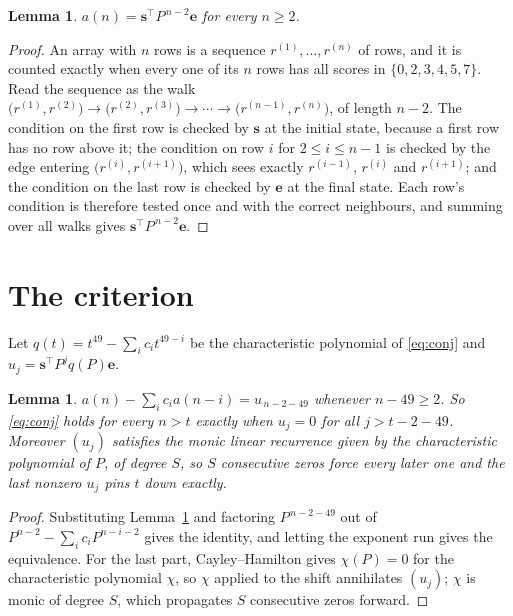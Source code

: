 \documentclass[11pt,a4paper]{article}
\theoremstyle{plain}
\newtheorem{lemma}[theorem]{Lemma}
\theoremstyle{definition}
\begin{document}
\begin{lemma}\label{lem:walk}
$a(n)=\mathbf{s}^{\!\top}P^{\,n-2}\mathbf{e}$ for every $n\ge2$.
\end{lemma}

\begin{proof}
An array with $n$ rows is a sequence $r^{(1)},\dots,r^{(n)}$ of rows, and it is counted
exactly when every one of its $n$ rows has all scores in $\{0,2,3,4,5,7\}$. Read the sequence as the
walk $\bigl(r^{(1)},r^{(2)}\bigr)\to\bigl(r^{(2)},r^{(3)}\bigr)\to\cdots\to
\bigl(r^{(n-1)},r^{(n)}\bigr)$, of length $n-2$. The condition on the first row is
checked by $\mathbf{s}$ at the initial state, because a first row has no row above it; the
condition on row $i$ for $2\le i\le n-1$ is checked by the edge entering
$\bigl(r^{(i)},r^{(i+1)}\bigr)$, which sees exactly $r^{(i-1)}$, $r^{(i)}$ and
$r^{(i+1)}$; and the condition on the last row is checked by $\mathbf{e}$ at the final
state. Each row's condition is therefore tested once and with the correct neighbours, and
summing over all walks gives $\mathbf{s}^{\!\top}P^{\,n-2}\mathbf{e}$.
\end{proof}

\section{The criterion}

Let $q(t)=t^{49}-\sum_i c_i t^{49-i}$ be the characteristic polynomial of
\eqref{eq:conj} and $u_j=\mathbf{s}^{\!\top}P^{j}q(P)\mathbf{e}$.

\begin{lemma}\label{lem:crit}
$a(n)-\sum_i c_i a(n-i)=u_{\,n-2-49}$ whenever $n-49\ge2$. So \eqref{eq:conj}
holds for every $n>t$ exactly when $u_j=0$ for all $j>t-2-49$. Moreover $(u_j)$
satisfies the monic linear recurrence given by the characteristic polynomial of $P$, of
degree $S$, so $S$ consecutive zeros force every later one and the last nonzero $u_j$ pins
$t$ down exactly.
\end{lemma}

\begin{proof}
Substituting Lemma~\ref{lem:walk} and factoring $P^{\,n-2-49}$ out of
$P^{n-2}-\sum_i c_i P^{n-i-2}$ gives the identity, and letting the exponent run gives the
equivalence. For the last part, Cayley--Hamilton gives $\chi(P)=0$ for the characteristic
polynomial $\chi$, so $\chi$ applied to the shift annihilates $(u_j)$; $\chi$ is monic of
degree $S$, which propagates $S$ consecutive zeros forward.
\end{proof}
\end{document}
